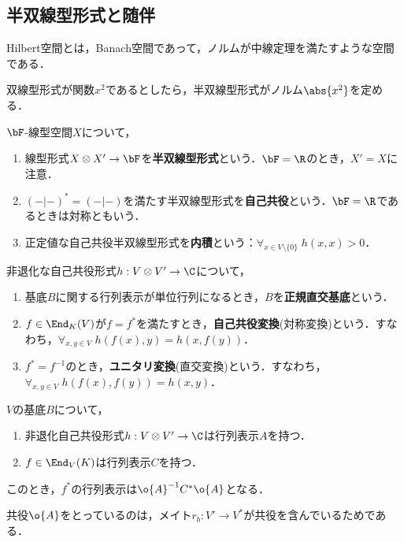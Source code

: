 \documentclass[uplatex, dvipdfmx]{jsreport}
\begin{document}
\subsection{半双線型形式と随伴}

\begin{tcolorbox}[colframe=ForestGreen, colback=ForestGreen!10!white,breakable,colbacktitle=ForestGreen!40!white,coltitle=black,fonttitle=\bfseries\sffamily,
title=]
    Hilbert空間とは，Banach空間であって，ノルムが中線定理を満たすような空間である．

    双線型形式が関数$x^2$であるとしたら，半双線型形式がノルム$\abs{x^2}$を定める．
\end{tcolorbox}

\begin{definition}
    $\bF$-線型空間$X$について，
    \begin{enumerate}
        \item 線型形式$X\otimes X'\to\bF$を\textbf{半双線型形式}という．$\bF=\R$のとき，$X'=X$に注意．
        \item $(-|-)^*=(-|-)$を満たす半双線型形式を\textbf{自己共役}という．$\bF=\R$であるときは対称ともいう．
        \item 正定値な自己共役半双線型形式を\textbf{内積}という：$\forall_{x\in V\setminus\{0\}}\;h(x,x)>0$．
    \end{enumerate}
\end{definition}

\begin{definition}
    非退化な自己共役形式$h:V\otimes V'\to\C$について，
    \begin{enumerate}
        \item 基底$B$に関する行列表示が単位行列になるとき，$B$を\textbf{正規直交基底}という．
        \item $f\in\End_K(V)$が$f=f^*$を満たすとき，\textbf{自己共役変換}(対称変換)という．すなわち，$\forall_{x,y\in V}\;h(f(x),y)=h(x,f(y))$．
        \item $f^*=f^{-1}$のとき，\textbf{ユニタリ変換}(直交変換)という．すなわち，$\forall_{x,y\in V}\;h(f(x),f(y))=h(x,y)$．
    \end{enumerate}
\end{definition}

\begin{proposition}
    $V$の基底$B$について，
    \begin{enumerate}
        \item 非退化自己共役形式$h:V\otimes V'\to\C$は行列表示$A$を持つ．
        \item $f\in\End_V(K)$は行列表示$C$を持つ．
    \end{enumerate}
    このとき，$f^*$の行列表示は$\o{A}^{-1}C^*\o{A}$となる．
\end{proposition}
\begin{Proof}
    共役$\o{A}$をとっているのは，メイト$r_b:V'\to V^*$が共役を含んでいるためである．
\end{Proof}
\end{document}
